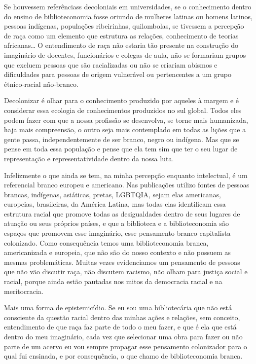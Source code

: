 \documentclass[a4paper,
fontsize=11pt,
oneside,
numbers=noperiodatend,
parskip=half-,
bibliography=totoc,
final
]{scrartcl}
\begin{document}
Se houvessem referênciass decoloniais em universidades, se o
conhecimento dentro do ensino de biblioteconomia fosse oriundo de
mulheres latinas ou homens latinos, pessoas indígenas, populações
ribeirinhas, quilombolas, se tivessem a percepção de raça como um
elemento que estrutura as relações, conhecimento de teorias
africanas\ldots{} O entendimento de raça não estaria tão presente na
construção do imaginário de docentes, funcionários e colegas de aula,
não se formariam grupos que excluem pessoas que são racializadas ou não
se criariam abismos e dificuldades para pessoas de origem vulnerável ou
pertencentes a um grupo étnico-racial não-branco.

Decolonizar é olhar para o conhecimento produzido por aqueles à margem e
é considerar essa ecologia de conhecimentos produzidos no sul global.
Todos eles podem fazer com que a nossa profissão se desenvolva, se torne
mais humanizada, haja mais compreensão, o outro seja mais contemplado em
todas as lições que a gente passa, independentemente de ser branco,
negro ou indígena. Mas que se pense em toda essa população e pense que
ela tem sim que ter o seu lugar de representação e representatividade
dentro da nossa luta.

Infelizmente o que ainda se tem, na minha percepção enquanto
intelectual, é um referencial branco europeu e americano. Nas
publicações utilizo fontes de pessoas brancas, indígenas, asiáticas,
pretas, LGBTQIA, sejam elas americanas, europeias, brasileiras, da
América Latina, mas todas elas identificam essa estrutura racial que
promove todas as desigualdades dentro de seus lugares de atuação ou seus
próprios países, e que a biblioteca e a biblioteconomia são espaços que
promovem esse imaginário, esse pensamento branco capitalista colonizado.
Como consequência temos uma biblioteconomia branca, americanizada e
europeia, que não são do nosso contexto e não possuem as mesmas
problemáticas. Muitas vezes evidenciamos um pensamento de pessoas que
não vão discutir raça, não discutem racismo, não olham para justiça
social e racial, porque ainda estão pautadas nos mitos da democracia
racial e na meritocracia.

Mais uma forma de epistemicídio. Se eu sou uma bibliotecária que não
está consciente da \linebreak questão racial dentro das minhas ações e relações,
sem conceito, entendimento de que raça faz parte de todo o meu fazer, e
que é ela que está dentro do meu imaginário, cada vez que selecionar uma
obra para fazer ou não parte de um acervo eu vou sempre propagar esse
pensamento colonizador para o qual fui ensinada, e por consequência, o
que chamo de biblioteconomia branca.
\end{document}
